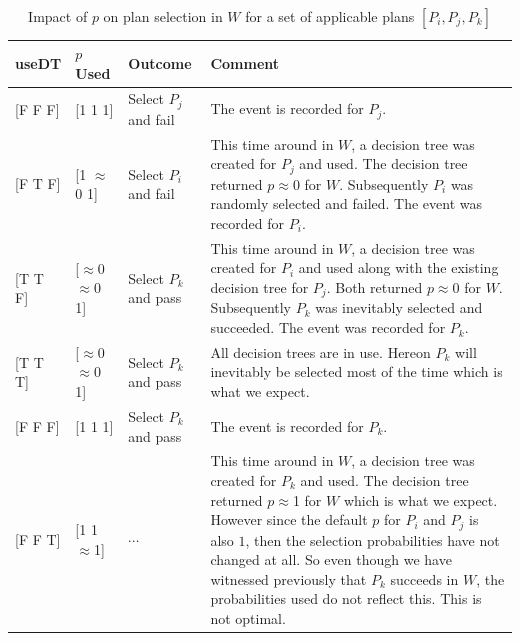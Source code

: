 \documentclass[a4paper]{article}
\newcommand{\dt}{{decision tree}\xspace}
\begin{document}
\begin{table}[htb]
  \begin{tabular}{ l l l p{}}
    \hline
    useDT & $p$ Used & Outcome & Comment\\ \hline
    
    [F F F] & [1 1 1] & Select $P_j$ and fail & The event is recorded for $P_j$. \\
    
    [F T F] & [1 $\approx$0 1] & Select $P_i$ and fail & This time around in $W$, a \dt was created for $P_j$ and used. The \dt returned $p\approx$0 for $W$. Subsequently $P_i$ was randomly selected and failed. The event was recorded for $P_i$.\\

    [T T F] & [$\approx$0 $\approx$0 1] & Select $P_k$ and pass & This time around in $W$, a \dt was created for $P_i$ and used along with the existing \dt for $P_j$. Both returned $p\approx$0 for $W$. Subsequently $P_k$ was inevitably selected and succeeded. The event was recorded for $P_k$.\\

    [T T T] & [$\approx$0 $\approx$0 1] & Select $P_k$ and pass & All {\dt}s are in use. Hereon $P_k$ will inevitably be selected most of the time which is what we expect.\\ \hline
    
    [F F F] & [1 1 1] & Select $P_k$ and pass & The event is recorded for $P_k$. \\
    
    [F F T] & [1 1 $\approx$1] & $\cdots$ & This time around in $W$, a \dt was created for $P_k$ and used. The \dt returned $p\approx$1 for $W$ which is what we expect. However since the default $p$ for $P_i$ and $P_j$ is also $1$, then the selection probabilities have not changed at all. So even though we have witnessed previously that $P_k$ succeeds in $W$, the probabilities used do not reflect this. This is not optimal.\\ \hline
    \hline
  \end{tabular}
  \caption{Impact of $p$ on plan selection in $W$ for a set of applicable plans $[P_i,P_j,P_k]$}
  \label{tab:p1Bad}
\end{table}
\end{document}
